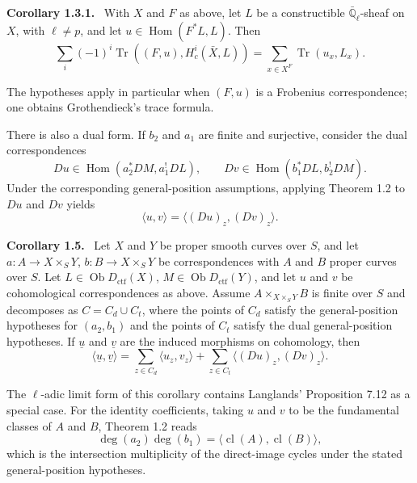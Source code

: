 \documentclass[11pt]{article}
\theoremstyle{plain}
\theoremstyle{definition}
\theoremstyle{remark}
\newenvironment{statement}[1]{\par\medskip\noindent\textbf{#1.}\ }{\par\medskip}
\newcommand{\QQ}{\mathbb Q}
\DeclareMathOperator{\Hom}{Hom}
\DeclareMathOperator{\ob}{Ob}
\DeclareMathOperator{\Tr}{Tr}
\DeclareMathOperator{\cl}{cl}
\begin{document}
\begin{statement}{Corollary 1.3.1}
With $X$ and $F$ as above, let $L$ be a constructible $\bar{\QQ}_\ell$-sheaf on $X$, with $\ell\ne p$, and let $u\in\Hom(F^*L,L)$. Then
\[
   \sum_i(-1)^i\Tr((F,u),H^i_c(\bar X,L))
      =\sum_{x\in X^F}\Tr(u_x,L_x).
\]
\end{statement}

The hypotheses apply in particular when $(F,u)$ is a Frobenius correspondence; one obtains Grothendieck's trace formula.

There is also a dual form. If $b_2$ and $a_1$ are finite and surjective, consider the dual correspondences
\[
   Du\in\Hom(a_2^*DM,a_1^!DL),
   \qquad
   Dv\in\Hom(b_1^*DL,b_2^!DM).
\]
Under the corresponding general-position assumptions, applying Theorem 1.2 to $Du$ and $Dv$ yields
\begin{equation}
   \langle u,v\rangle=\langle (Du)_z,(Dv)_z\rangle.
   \tag{1.4.1}
\end{equation}

\begin{statement}{Corollary 1.5}
Let $X$ and $Y$ be proper smooth curves over $S$, and let $a:A\to X\times_SY$, $b:B\to X\times_SY$ be correspondences with $A$ and $B$ proper curves over $S$. Let $L\in\ob D_{\mathrm{ctf}}(X)$, $M\in\ob D_{\mathrm{ctf}}(Y)$, and let $u$ and $v$ be cohomological correspondences as above. Assume $A\times_{X\times_SY}B$ is finite over $S$ and decomposes as $C=C_d\cup C_t$, where the points of $C_d$ satisfy the general-position hypotheses for $(a_2,b_1)$ and the points of $C_t$ satisfy the dual general-position hypotheses. If $\underline u$ and $\underline v$ are the induced morphisms on cohomology, then
\begin{equation}
   \langle \underline u,\underline v\rangle=
   \sum_{z\in C_d}\langle u_z,v_z\rangle+
   \sum_{z\in C_t}\langle (Du)_z,(Dv)_z\rangle.
   \tag{1.5.1}
\end{equation}
\end{statement}

The $\ell$-adic limit form of this corollary contains Langlands' Proposition 7.12 as a special case. For the identity coefficients, taking $u$ and $v$ to be the fundamental classes of $A$ and $B$, Theorem 1.2 reads
\begin{equation}
   \deg(a_2)\deg(b_1)=\langle \cl(A),\cl(B)\rangle,
   \tag{1.7.1}
\end{equation}
which is the intersection multiplicity of the direct-image cycles under the stated general-position hypotheses.
\end{document}
